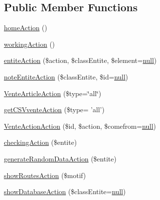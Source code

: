 \subsection*{Public Member Functions}
\begin{DoxyCompactItemize}
\item 
\hyperlink{class_acme_group_1_1_labo_bundle_1_1_controller_1_1_labo_controller_a318e32de2d572462ddecf7bd4a81945a}{home\+Action} ()
\item 
\hyperlink{class_acme_group_1_1_labo_bundle_1_1_controller_1_1_labo_controller_a358cc5d33ebc8f85db2099a6e39aa808}{working\+Action} ()
\item 
\hyperlink{class_acme_group_1_1_labo_bundle_1_1_controller_1_1_labo_controller_acc47129630316920a501c47e11b08624}{entite\+Action} (\$action, \$class\+Entite, \$element=\hyperlink{validate_8js_afb8e110345c45e74478894341ab6b28e}{null})
\item 
\hyperlink{class_acme_group_1_1_labo_bundle_1_1_controller_1_1_labo_controller_ad36c47fd438e0c4500353985ebc191ba}{note\+Entite\+Action} (\$class\+Entite, \$id=\hyperlink{validate_8js_afb8e110345c45e74478894341ab6b28e}{null})
\item 
\hyperlink{class_acme_group_1_1_labo_bundle_1_1_controller_1_1_labo_controller_a9a8c9dbaac0260dd1bda4c168267c2e4}{Vente\+Article\+Action} (\$type=\char`\"{}all\char`\"{})
\item 
\hyperlink{class_acme_group_1_1_labo_bundle_1_1_controller_1_1_labo_controller_aba1aa9e168e72267959725bb5484ab65}{get\+C\+S\+Vvente\+Action} (\$type= 'all')
\item 
\hyperlink{class_acme_group_1_1_labo_bundle_1_1_controller_1_1_labo_controller_a888bfebdaa14b7ed14a949e7e51053aa}{Vente\+Action\+Action} (\$id, \$action, \$comefrom=\hyperlink{validate_8js_afb8e110345c45e74478894341ab6b28e}{null})
\item 
\hyperlink{class_acme_group_1_1_labo_bundle_1_1_controller_1_1_labo_controller_aa26c77c7dbff54a32427b126e9919cbd}{checking\+Action} (\$entite)
\item 
\hyperlink{class_acme_group_1_1_labo_bundle_1_1_controller_1_1_labo_controller_a5d629c96032db64e8fc79fee8fd75ade}{generate\+Random\+Data\+Action} (\$entite)
\item 
\hyperlink{class_acme_group_1_1_labo_bundle_1_1_controller_1_1_labo_controller_ac0092894e30a0da855d166f7ade92b7f}{show\+Routes\+Action} (\$motif)
\item 
\hyperlink{class_acme_group_1_1_labo_bundle_1_1_controller_1_1_labo_controller_ae41297c23b346dc06e6657a74363db61}{show\+Database\+Action} (\$class\+Entite=\hyperlink{validate_8js_afb8e110345c45e74478894341ab6b28e}{null})

\end{DoxyCompactItemize}
